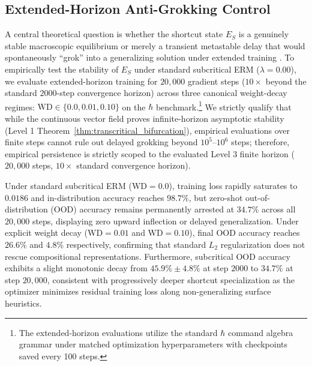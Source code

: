 \documentclass{article}
\theoremstyle{plain}
\theoremstyle{definition}
\begin{document}
\subsection{Extended-Horizon Anti-Grokking Control}
\label{sec:extended_horizon_grokking}
A central theoretical question is whether the shortcut state $E_S$ is a genuinely stable macroscopic equilibrium or merely a transient metastable delay that would spontaneously ``grok'' into a generalizing solution under extended training \citep{Power2022Grokking,Liu2022Grokking,Nakkiran2021Deep,Varma2023Explaining}. To empirically test the stability of $E_S$ under standard subcritical ERM ($\lambda = 0.00$), we evaluate extended-horizon training for $20{,}000$ gradient steps ($10\times$ beyond the standard $2000$-step convergence horizon) across three canonical weight-decay regimes: $\text{WD} \in \{0.0, 0.01, 0.10\}$ on the $\hbar$ benchmark.\footnote{The extended-horizon evaluations utilize the standard $\hbar$ command algebra grammar under matched optimization hyperparameters with checkpoints saved every 100 steps.} We strictly qualify that while the continuous vector field proves infinite-horizon asymptotic stability (Level 1 Theorem~\ref{thm:transcritical_bifurcation}), empirical evaluations over finite steps cannot rule out delayed grokking beyond $10^5$--$10^6$ steps; therefore, empirical persistence is strictly scoped to the evaluated Level 3 finite horizon ($20{,}000$ steps, $10\times$ standard convergence horizon).

Under standard subcritical ERM ($\text{WD}=0.0$), training loss rapidly saturates to $0.0186$ and in-distribution accuracy reaches $98.7\%$, but zero-shot out-of-distribution (OOD) accuracy remains permanently arrested at $34.7\%$ across all $20{,}000$ steps, displaying zero upward inflection or delayed generalization. Under explicit weight decay ($\text{WD}=0.01$ and $\text{WD}=0.10$), final OOD accuracy reaches $26.6\%$ and $4.8\%$ respectively, confirming that standard $L_2$ regularization does not rescue compositional representations. Furthermore, subcritical OOD accuracy exhibits a slight monotonic decay from $45.9\% \pm 4.8\%$ at step $2000$ to $34.7\%$ at step $20{,}000$, consistent with progressively deeper shortcut specialization as the optimizer minimizes residual training loss along non-generalizing surface heuristics.
\end{document}
